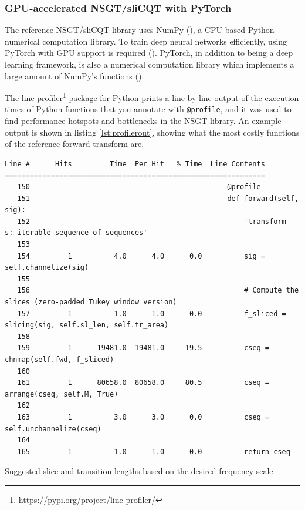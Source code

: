 \documentclass[report.tex]{subfiles}
\begin{document}
\newpagefill

\subsubsection{GPU-accelerated NSGT/sliCQT with PyTorch}
\label{sec:torchslicq}

The reference NSGT/sliCQT library uses NumPy (\cite{numpy}), a CPU-based Python numerical computation library. To train deep neural networks efficiently, using PyTorch with GPU support is required (\cite{pytorch}). PyTorch, in addition to being a deep learning framework, is also a numerical computation library which implements a large amount of NumPy's functions (\cite{pytorch}).

The line-profiler\footnote{\url{https://pypi.org/project/line-profiler/}} package for Python prints a line-by-line output of the execution times of Python functions that you annotate with \Verb#@profile#, and it was used to find performance hotspots and bottlenecks in the NSGT library. An example output is shown in listing \ref{lst:profilerout}, showing what the most costly functions of the reference forward transform are.

\begin{listing}[h]
  \centering
\begin{verbatim}
Line #      Hits         Time  Per Hit   % Time  Line Contents
==============================================================
   150                                               @profile
   151                                               def forward(self, sig):
   152                                                   'transform - s: iterable sequence of sequences'
   153
   154         1          4.0      4.0      0.0          sig = self.channelize(sig)
   155
   156                                                   # Compute the slices (zero-padded Tukey window version)
   157         1          1.0      1.0      0.0          f_sliced = slicing(sig, self.sl_len, self.tr_area)
   158
   159         1      19481.0  19481.0     19.5          cseq = chnmap(self.fwd, f_sliced)
   160
   161         1      80658.0  80658.0     80.5          cseq = arrange(cseq, self.M, True)
   162
   163         1          3.0      3.0      0.0          cseq = self.unchannelize(cseq)
   164
   165         1          1.0      1.0      0.0          return cseq
\end{verbatim}
  \caption{Suggested slice and transition lengths based on the desired frequency scale}
  \label{code:slicenoslice}
\end{listing}
\end{document}
